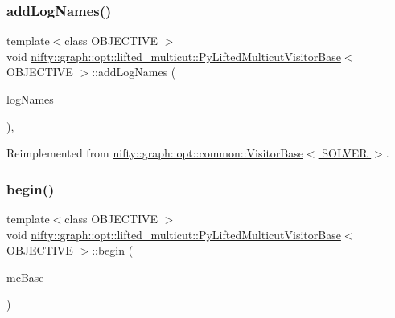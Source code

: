 \subsubsection{\texorpdfstring{add\+Log\+Names()}{addLogNames()}}
{\footnotesize\ttfamily template$<$class O\+B\+J\+E\+C\+T\+I\+VE $>$ \\
void \hyperlink{classnifty_1_1graph_1_1opt_1_1lifted__multicut_1_1PyLiftedMulticutVisitorBase}{nifty\+::graph\+::opt\+::lifted\+\_\+multicut\+::\+Py\+Lifted\+Multicut\+Visitor\+Base}$<$ O\+B\+J\+E\+C\+T\+I\+VE $>$\+::add\+Log\+Names (\begin{DoxyParamCaption}\item[{std\+::initializer\+\_\+list$<$ std\+::string $>$}]{log\+Names }\end{DoxyParamCaption})\hspace{0.3cm}{\ttfamily [inline]}, {\ttfamily [virtual]}}



Reimplemented from \hyperlink{classnifty_1_1graph_1_1opt_1_1common_1_1VisitorBase_acc4f1b419303965b0313ca83c6a7a420}{nifty\+::graph\+::opt\+::common\+::\+Visitor\+Base$<$ S\+O\+L\+V\+E\+R $>$}.

\mbox{\label{classnifty_1_1graph_1_1opt_1_1lifted__multicut_1_1PyLiftedMulticutVisitorBase_a67233e1adc5ab7dc616c76ca42990dca}} 
\subsubsection{\texorpdfstring{begin()}{begin()}}
{\footnotesize\ttfamily template$<$class O\+B\+J\+E\+C\+T\+I\+VE $>$ \\
void \hyperlink{classnifty_1_1graph_1_1opt_1_1lifted__multicut_1_1PyLiftedMulticutVisitorBase}{nifty\+::graph\+::opt\+::lifted\+\_\+multicut\+::\+Py\+Lifted\+Multicut\+Visitor\+Base}$<$ O\+B\+J\+E\+C\+T\+I\+VE $>$\+::begin (\begin{DoxyParamCaption}\item[{\hyperlink{classnifty_1_1graph_1_1opt_1_1lifted__multicut_1_1PyLiftedMulticutVisitorBase_ab42d6b0fdecfe2dc9232654ce690c923}{Lmc\+Base} $\ast$}]{mc\+Base }\end{DoxyParamCaption})\hspace{0.3cm}{\ttfamily [inline]}}

